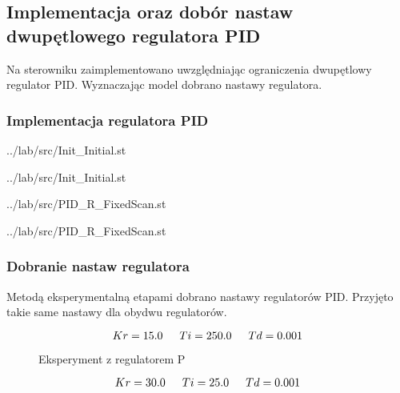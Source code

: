 \subsection{Implementacja oraz dobór nastaw dwupętlowego regulatora PID}
\label{lab:zad3}


Na	sterowniku	zaimplementowano	uwzględniając	ograniczenia	dwupętlowy	
regulator	PID. Wyznaczając model dobrano nastawy regulatora.

\subsubsection{Implementacja regulatora PID}

\ifdefined\CompileListings
    
        {../lab/src/Init_Initial.st}
\fi

\ifdefined\CompileListings
    
        {../lab/src/Init_Initial.st}
    \newpage
\fi

\ifdefined\CompileListings
    
        {../lab/src/PID_R_FixedScan.st}
    \newpage
\fi

\ifdefined\CompileListings
    
        {../lab/src/PID_R_FixedScan.st}
\fi
\newpage
\subsubsection{Dobranie nastaw regulatora}

Metodą eksperymentalną etapami dobrano nastawy regulatorów PID.
\newline
Przyjęto takie same nastawy dla obydwu regulatorów.

$$Kr = \num{15.0} \indent Ti = \num{250.0} \indent Td = \num{0.001}$$

\ifdefined\CompileFigures
\begin{figure}[H] 
    \centering
    
    \caption{Eksperyment z regulatorem P}
    \label{lab:zad3:figure:regulatorP}
 \end{figure}
 \fi

 $$Kr = \num{30.0} \indent Ti = \num{25.0} \indent Td = \num{0.001}$$

